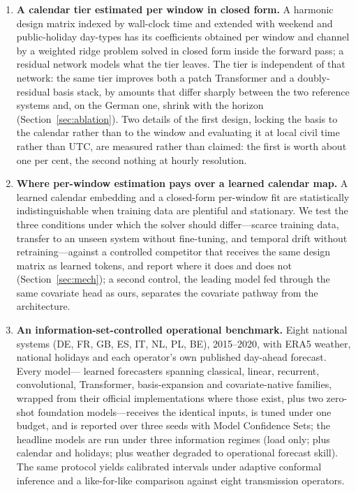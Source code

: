 \begin{enumerate}
\item \textbf{A calendar tier estimated per window in closed form.} A harmonic design matrix
indexed by wall-clock time and extended with weekend and public-holiday day-types has its
coefficients obtained per window and channel by a weighted ridge problem solved in closed
form inside the forward pass; a residual network models what the tier leaves. The tier is
independent of that network: the same tier improves both a patch Transformer and a
doubly-residual basis stack, by amounts that differ sharply between the two reference systems and, on the German
one, shrink with the horizon (Section~\ref{sec:ablation}). Two details of the first design,
locking the basis to the calendar rather than to the window and evaluating it at local civil
time rather than UTC, are measured rather than claimed: the first is worth about one per
cent, the second nothing at hourly resolution.

\item \textbf{Where per-window estimation pays over a learned calendar map.} A learned
calendar embedding and a closed-form per-window fit are statistically indistinguishable when
training data are plentiful and stationary. We test the three conditions under which the
solver should differ---scarce training data, transfer to an unseen system without
fine-tuning, and temporal drift without retraining---against a controlled competitor that
receives the same design matrix as learned tokens, and report where it does and does not
(Section~\ref{sec:mech}); a second control, the leading model fed through the same covariate
head as ours, separates the covariate pathway from the architecture.

\item \textbf{An information-set-controlled operational benchmark.} Eight national systems
(DE, FR, GB, ES, IT, NL, PL, BE), 2015--2020, with ERA5 weather, national holidays and each
operator's own published day-ahead forecast. Every model--- learned
forecasters spanning classical, linear, recurrent, convolutional, Transformer, basis-expansion
and covariate-native families, wrapped from their official implementations where those exist,
plus two zero-shot foundation models---receives the identical inputs, is tuned under one
budget, and is reported over three seeds with Model Confidence Sets; the headline models are
run under three information regimes (load only; plus calendar and holidays; plus weather
degraded to operational forecast skill). The same protocol yields calibrated intervals under adaptive conformal
inference and a like-for-like comparison against eight transmission operators.
\end{enumerate}

